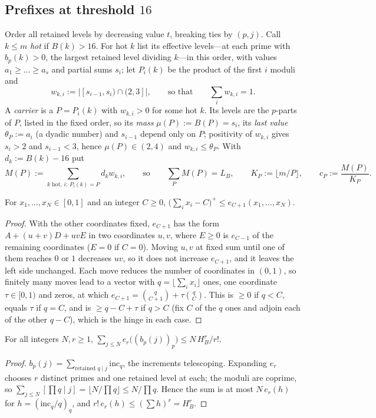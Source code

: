 \subsection*{Prefixes at threshold $16$}

Order all retained levels by decreasing value $t$, breaking ties by $(p,j)$. Call $k\le m$ \emph{hot} if $B(k)>16$. For hot $k$ list
its effective levels---at each prime with $b_p(k)>0$, the largest retained level dividing $k$---in this order, with values
$a_1\ge\dots\ge a_s$ and partial sums $s_i$; let $P_i(k)$ be the product of the first $i$ moduli and
\[
w_{k,i}:=\bigl|[s_{i-1},s_i)\cap(2,3]\bigr|,\qquad\text{so that}\qquad\sum_iw_{k,i}=1 .
\]
A \emph{carrier} is a $P=P_i(k)$ with $w_{k,i}>0$ for some hot $k$. Its levels are the $p$-parts of $P$, listed in the fixed order,
so its \emph{mass} $\mu(P):=B(P)=s_i$, its \emph{last value} $\theta_P:=a_i$ (a dyadic number) and $s_{i-1}$ depend only on $P$;
positivity of $w_{k,i}$ gives $s_i>2$ and $s_{i-1}<3$, hence $\mu(P)\in(2,4)$ and $w_{k,i}\le\theta_P$. With $d_k:=B(k)-16$ put
\[
M(P):=\sum_{k\text{ hot},\,i:\,P_i(k)=P}d_kw_{k,i},\qquad\text{so}\qquad\sum_PM(P)=L_B,\qquad K_P:=\lfloor m/P\rfloor,\qquad c_P:=\frac{M(P)}{K_P}.
\]

\begin{lemma}[hinge]\label{lem:hinge}
For $x_1,\dots,x_N\in[0,1]$ and an integer $C\ge0$, $\bigl(\sum_ix_i-C\bigr)^+\le e_{C+1}(x_1,\dots,x_N)$.
\end{lemma}
\begin{proof}
With the other coordinates fixed, $e_{C+1}$ has the form $A+(u+v)D+uvE$ in two coordinates $u,v$, where $E\ge0$ is $e_{C-1}$ of the
remaining coordinates ($E=0$ if $C=0$). Moving $u,v$ at fixed sum until one of them reaches $0$ or $1$ decreases $uv$, so it does not
increase $e_{C+1}$, and it leaves the left side unchanged. Each move reduces the number of coordinates in $(0,1)$, so finitely many
moves lead to a vector with $q=\lfloor\sum_ix_i\rfloor$ ones, one coordinate $\tau\in[0,1)$ and zeros, at which
$e_{C+1}=\binom q{C+1}+\tau\binom qC$. This is $\ge0$ if $q<C$, equals $\tau$ if $q=C$, and is $\ge q-C+\tau$ if $q>C$ (fix $C$ of
the $q$ ones and adjoin each of the other $q-C$), which is the hinge in each case.
\end{proof}

\begin{lemma}\label{lem:moment}
For all integers $N,r\ge1$, $\sum_{j\le N}e_r\bigl((b_p(j))_p\bigr)\le N\,H_B^r/r!$.
\end{lemma}
\begin{proof}
$b_p(j)=\sum_{\text{retained }q\mid j}\mathrm{inc}_q$, the increments telescoping. Expanding $e_r$ chooses $r$ distinct primes and one
retained level at each; the moduli are coprime, so $\sum_{j\le N}[\prod q\mid j]=\lfloor N/\prod q\rfloor\le N/\prod q$. Hence the sum is
at most $N\,e_r(h)$ for $h=(\mathrm{inc}_q/q)_q$, and $r!\,e_r(h)\le(\sum h)^r=H_B^r$.
\end{proof}

